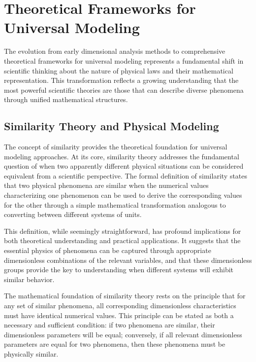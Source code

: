 \documentclass[
	11pt, %
	fleqn, %
	a4paper, %
]{LegrandOrangeBook}
\begin{document}
\section{Theoretical Frameworks for Universal Modeling}

The evolution from early dimensional analysis methods to comprehensive theoretical frameworks for universal modeling represents a fundamental shift in scientific thinking about the nature of physical laws and their mathematical representation. This transformation reflects a growing understanding that the most powerful scientific theories are those that can describe diverse phenomena through unified mathematical structures.

\subsection{Similarity Theory and Physical Modeling}

The concept of similarity provides the theoretical foundation for universal modeling approaches. At its core, similarity theory addresses the fundamental question of when two apparently different physical situations can be considered equivalent from a scientific perspective. The formal definition of similarity states that two physical phenomena are similar when the numerical values characterizing one phenomenon can be used to derive the corresponding values for the other through a simple mathematical transformation analogous to converting between different systems of units.

This definition, while seemingly straightforward, has profound implications for both theoretical understanding and practical applications. It suggests that the essential physics of phenomena can be captured through appropriate dimensionless combinations of the relevant variables, and that these dimensionless groups provide the key to understanding when different systems will exhibit similar behavior.

The mathematical foundation of similarity theory rests on the principle that for any set of similar phenomena, all corresponding dimensionless characteristics must have identical numerical values. This principle can be stated as both a necessary and sufficient condition: if two phenomena are similar, their dimensionless parameters will be equal; conversely, if all relevant dimensionless parameters are equal for two phenomena, then these phenomena must be physically similar.
\end{document}
